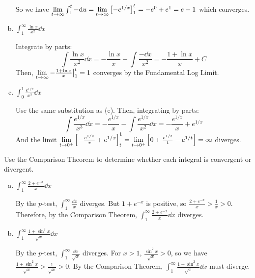 \documentclass{agony}
\begin{document}
\begin{enumerate}[(a)]
\begin{sol}
          So we have $\lim\limits_{t\to\infty} \int_1^t -\dd u = \lim\limits_{t\to\infty} \qty[-e^{1/x}]_1^t
            = - e^0 + e^1 = e - 1$
          which converges.
        \end{sol}
  \item $\int_1^\infty \frac{\ln x}{x^2} \dd{x}$
        \begin{sol}
          Integrate by parts:
          \[
            \int \frac{\ln x}{x^2} \dd{x}
            = -\frac{\ln x}{x} - \int \frac{-\dd x}{x^2}
            = -\frac{1+\ln x}{x} + C
          \]
          Then, $\lim\limits_{t\to\infty} -\frac{1+\ln x}{x} \big|_1^t = 1$
          converges by the Fundamental Log Limit.
        \end{sol}
  \item $\int_0^1 \frac{e^{1/x}}{x^3} \dd{x}$
        \begin{sol}
          Use the same substitution as (e).
          Then, integrating by parts:
          \[
            \int \frac{e^{1/x}}{x^3} \dd{x}
            = -\frac{e^{1/x}}{x} - \int \frac{e^{1/x}}{x^2} \dd{x}
            = -\frac{e^{1/x}}{x} + e^{1/x}
          \]
          And the limit $\lim\limits_{t\to0^+} \qty[-\frac{e^{1/x}}{x} + e^{1/x}]_t^1
            = \lim\limits_{t\to0^+} \qty[0 + \frac{e^{1/t}}{t} - e^{1/t}] = \infty$
          diverges.
        \end{sol}
\end{enumerate}

\begin{prob}
  Use the Comparison Theorem to determine whether each integral is convergent or divergent.
\end{prob}
\begin{enumerate}[(a)]
  \item $\int_1^\infty \frac{2 + e^{-x}}{x} \dd{x}$
        \begin{prf}
          By the $p$-test, $\int_1^\infty \frac{\dd x}{x}$ diverges.
          But $1+e^{-x}$ is positive, so $\frac{2 + e^{-x}}{x} > \frac{1}{x} > 0$.
          Therefore, by the Comparison Theorem, $\int_1^\infty \frac{2 + e^{-x}}{x} \dd{x}$ diverges.
        \end{prf}
  \item $\int_1^\infty \frac{1 + \sin^2 x}{\sqrt{x}} \dd{x}$
        \begin{prf}
          By the $p$-test, $\int_1^\infty \frac{\dd x}{\sqrt{x}}$ diverges.
          For $x > 1$, $\frac{\sin^2 x}{\sqrt{x}} > 0$, so we have
          $\frac{1 + \sin^2 x}{\sqrt{x}} > \frac{1}{\sqrt{x}} > 0$.
          By the Comparison Theorem,
          $\int_1^\infty \frac{1 + \sin^2 x}{\sqrt{x}} \dd{x}$ must diverge.
        \end{prf}
\end{enumerate}
\end{document}
